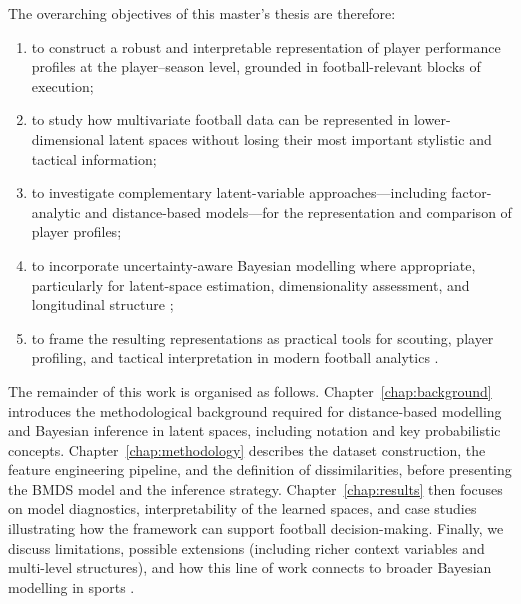 \documentclass{fmetfm}
\begin{document}
The overarching objectives of this master's thesis are therefore:
\begin{enumerate}
  \item to construct a robust and interpretable representation of player performance profiles at the player--season level, grounded in football-relevant blocks of execution;
  \item to study how multivariate football data can be represented in lower-dimensional latent spaces without losing their most important stylistic and tactical information;
  \item to investigate complementary latent-variable approaches---including factor-analytic and distance-based models---for the representation and comparison of player profiles;
  \item to incorporate uncertainty-aware Bayesian modelling where appropriate, particularly for latent-space estimation, dimensionality assessment, and longitudinal structure \cite{oh2001bayesian,yanchenko2020hierarchical};
  \item to frame the resulting representations as practical tools for scouting, player profiling, and tactical interpretation in modern football analytics \cite{teixeira2025mapping,orucc2024analysis}.
\end{enumerate}

The remainder of this work is organised as follows. Chapter~\ref{chap:background} introduces the methodological background required for distance-based modelling and Bayesian inference in latent spaces, including notation and key probabilistic concepts. Chapter~\ref{chap:methodology} describes the dataset construction, the feature engineering pipeline, and the definition of dissimilarities, before presenting the BMDS model and the inference strategy. Chapter~\ref{chap:results} then focuses on model diagnostics, interpretability of the learned spaces, and case studies illustrating how the framework can support football decision-making. Finally, we discuss limitations, possible extensions (including richer context variables and multi-level structures), and how this line of work connects to broader Bayesian modelling in sports \cite{baio2010bayesian,ribeiro2025bayesian,swinton2023bayesian}.









\appendix
\end{document}
